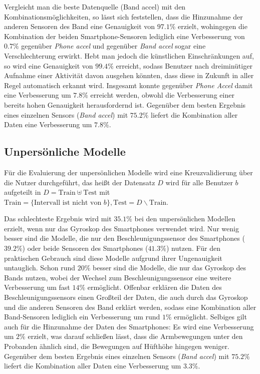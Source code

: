 Vergleicht man die beste Datenquelle (Band accel) mit den Kombinationsmöglichkeiten, so lässt sich feststellen, dass die Hinzunahme der anderen Sensoren des Band eine Genauigkeit von $97.1 \%$ erzielt, wohingegen die Kombination der beiden Smartphone-Sensoren lediglich eine Verbesserung von $0.7 \%$ gegenüber \textit{Phone accel} und gegenüber \textit{Band accel} sogar eine Verschlechterung erwirkt. Hebt man jedoch die künstlichen Einschränkungen auf, so wird eine Genauigkeit von $99.4 \%$ erreicht, sodass Benutzer nach dreiminütiger Aufnahme einer Aktivität davon ausgehen könnten, dass diese in Zukunft in aller Regel automatisch erkannt wird. Insgesamt konnte gegenüber \textit{Phone Accel} damit eine Verbesserung um $7.8 \%$ erreicht werden, obwohl die Verbesserung einer bereits hohen Genauigkeit herausfordernd ist. Gegenüber dem besten Ergebnis eines einzelnen Sensors (\textit{Band accel}) mit $75.2 \%$ liefert die Kombination aller Daten eine Verbesserung um $7.8 \%$.

\subsection{Unpersönliche Modelle}
Für die Evaluierung der unpersönlichen Modelle wird eine Kreuzvalidierung über die Nutzer durchgeführt, das heißt der Datensatz $D$ wird für alle Benutzer $b$ aufgeteilt in $D = \text{Train} \uplus \text{Test}$ mit $\text{Train} = \{\text{Intervall ist nicht von } b\}, \text{Test} = D \backslash \text{Train}$.

Das schlechteste Ergebnis wird mit $35.1 \%$ bei den unpersönlichen Modellen erzielt, wenn nur das Gyroskop des Smartphones verwendet wird. Nur wenig besser sind die Modelle, die nur den Beschleunigungssensor des Smartphones ($39.2 \%$) oder beide Sensoren des Smartphones ($41.3 \%$) nutzen. Für den praktischen Gebrauch sind diese Modelle aufgrund ihrer Ungenauigkeit untauglich. Schon rund $20 \%$ besser sind die Modelle, die nur das Gyroskop des Bands nutzen, wobei der Wechsel zum Beschleunigungssensor eine weitere Verbesserung um fast $14 \%$ ermöglicht. Offenbar erklären die Daten des Beschleunigungssensors einen Großteil der Daten, die auch durch das Gyroskop und die anderen Sensoren des Band erklärt werden, sodass eine Kombination aller Band-Sensoren lediglich ein Verbesserung um rund $1 \%$ ermöglicht. Selbiges gilt auch für die Hinzunahme der Daten des Smartphones: Es wird eine Verbesserung um $2 \%$ erzielt, was darauf schließen lässt, dass die Armbewegungen unter den Probanden ähnlich sind, die Bewegungen auf Hüfthöhe hingegen weniger. Gegenüber dem besten Ergebnis eines einzelnen Sensors (\textit{Band accel}) mit $75.2 \%$ liefert die Kombination aller Daten eine Verbesserung um $3.3 \%$.


